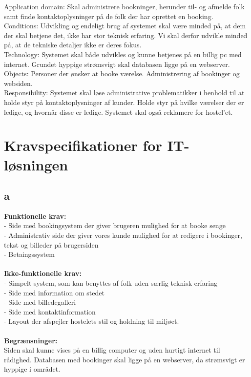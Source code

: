 \documentclass[12pt,a4paper]{article}
\begin{document}
Application domain: Skal administrere bookninger, herunder til- og afmelde folk samt finde kontaktoplysninger på de folk der har oprettet en booking.\\
 
Conditions: Udvikling og endeligt brug af systemet skal være minded på, at dem der skal betjene det, ikke har stor teknisk erfaring. Vi skal derfor udvikle minded på, at de tekniske detaljer ikke er deres fokus.\\

Technology: Systemet skal både udvikles og kunne betjenes på en billig pc med internet. Grundet hyppige strømsvigt skal databasen ligge på en webserver. \\

Objects: Personer der ønsker at booke værelse. Administrering af bookinger og websiden.\\

Responsibility: Systemet skal løse administrative problematikker i henhold til at holde styr på kontaktoplysninger af kunder. Holde styr på hvilke værelser der er ledige, og hvornår disse er ledige. Systemet skal også reklamere for hostel'et.\\
\newpage
\section{Kravspecifikationer for IT-løsningen}
\subsection{a}
\textbf{Funktionelle krav:} \\
- Side med bookingsystem der giver brugeren mulighed for at booke senge\\
- Administrativ side der giver vores kunde mulighed for at redigere i bookinger, tekst og billeder på brugersiden\\
- Betaingssystem\\\\
       \textbf{Ikke-funktionelle krav:} \\
- Simpelt system, som kan benyttes af folk uden særlig teknisk erfaring\\
- Side med information om stedet\\
- Side med billedegalleri\\
- Side med kontaktinformation\\
- Layout der afspejler hostelets stil og holdning til miljøet. \\\\
      \textbf{Begrænsninger:} \\
	Siden skal kunne vises på en billig computer og uden hurtigt internet til rådighed. Databasen med bookinger skal ligge på en webserver, da strømsvigt er hyppige i området.
\end{document}
